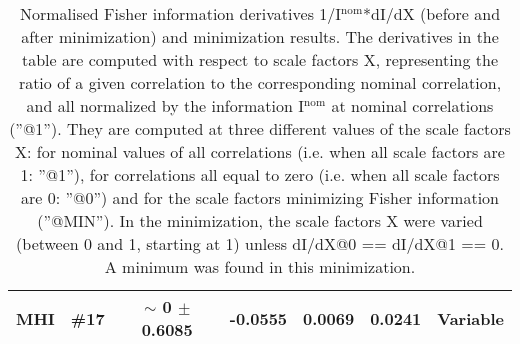 \begin{table}[H]
\begin{center}
\begin{tabular}{|c|c|c|ccc|c|}
 {\tiny MHI} & \#17 & {\tiny $\sim$ }0 $\pm$    0.6085 &   -0.0555 &    0.0069 &    0.0241 & Variable \\
\hline
\end{tabular}
\renewcommand{\arraystretch}{1}
\caption{Normalised Fisher information derivatives 1/I$^\mathrm{nom}$*dI/dX (before and after minimization) and minimization results.  The derivatives in the table are computed with respect to scale factors X, representing the ratio of a given correlation to the corresponding nominal correlation, and all normalized by the information I$^\mathrm{nom}$ at nominal correlations (''@1''). They are computed at three different values of the scale factors X: for nominal values of all correlations (i.e. when all scale factors are 1: ''@1''), for correlations all equal to zero (i.e. when all scale factors are 0: ''@0'') and for the scale factors minimizing Fisher information (''@MIN''). In the minimization, the scale factors X were varied (between 0 and 1, starting at 1) unless dI/dX@0 == dI/dX@1 == 0. A minimum was found in this minimization.}
\end{center}
\end{table}

